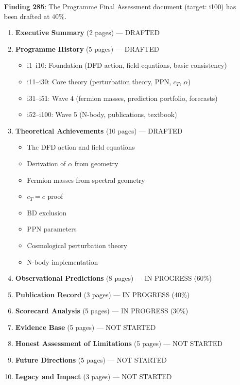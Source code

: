 \documentclass[11pt,a4paper]{article}
\begin{document}
\textbf{Finding 285}: The Programme Final Assessment document (target: i100) has been drafted at 40\%.

\begin{tcolorbox}[colback=blue!5!white, colframe=dfdblue, title=\textbf{Programme Final Assessment: Draft Structure}]
\begin{enumerate}
\item \textbf{Executive Summary} (2 pages) --- DRAFTED
\item \textbf{Programme History} (5 pages) --- DRAFTED
\begin{itemize}[nosep]
\item i1--i10: Foundation (DFD action, field equations, basic consistency)
\item i11--i30: Core theory (perturbation theory, PPN, $c_T$, $\alpha$)
\item i31--i51: Wave 4 (fermion masses, prediction portfolio, forecasts)
\item i52--i100: Wave 5 (N-body, publications, textbook)
\end{itemize}
\item \textbf{Theoretical Achievements} (10 pages) --- DRAFTED
\begin{itemize}[nosep]
\item The DFD action and field equations
\item Derivation of $\alpha$ from geometry
\item Fermion masses from spectral geometry
\item $c_T = c$ proof
\item BD exclusion
\item PPN parameters
\item Cosmological perturbation theory
\item N-body implementation
\end{itemize}
\item \textbf{Observational Predictions} (8 pages) --- IN PROGRESS (60\%)
\item \textbf{Publication Record} (3 pages) --- IN PROGRESS (40\%)
\item \textbf{Scorecard Analysis} (5 pages) --- IN PROGRESS (30\%)
\item \textbf{Evidence Base} (5 pages) --- NOT STARTED
\item \textbf{Honest Assessment of Limitations} (5 pages) --- NOT STARTED
\item \textbf{Future Directions} (5 pages) --- NOT STARTED
\item \textbf{Legacy and Impact} (3 pages) --- NOT STARTED
\end{enumerate}
\end{tcolorbox}
\end{document}
